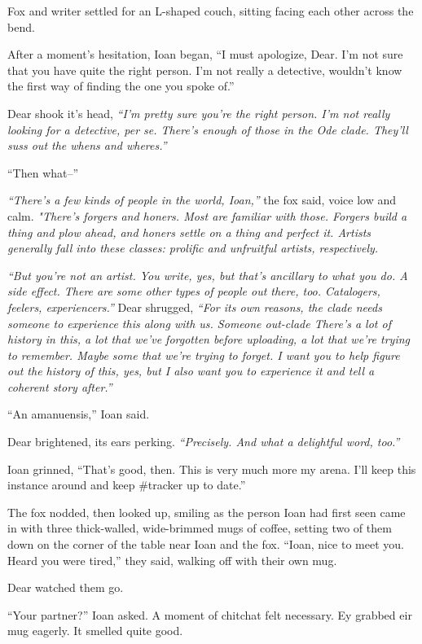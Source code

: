 Fox and writer settled for an L-shaped couch, sitting facing each other across the bend.

After a moment's hesitation, Ioan began, ``I must apologize, Dear. I'm not sure that you have quite the right person. I'm not really a detective, wouldn't know the first way of finding the one you spoke of.''

Dear shook it's head, \emph{``I'm pretty sure you're the right person. I'm not really looking for a detective, per se. There's enough of those in the Ode clade. They'll suss out the whens and wheres.''}

``Then what--''

\emph{``There's a few kinds of people in the world, Ioan,''} the fox said, voice low and calm. \emph{"There's forgers and honers. Most are familiar with those. Forgers build a thing and plow ahead, and honers settle on a thing and perfect it. Artists generally fall into these classes: prolific and unfruitful artists, respectively.}

\emph{``But you're not an artist. You write, yes, but that's ancillary to what you do. A side effect. There are some other types of people out there, too. Catalogers, feelers, experiencers.''} Dear shrugged, \emph{``For its own reasons, the clade needs someone to experience this along with us. Someone out-clade There's a lot of history in this, a lot that we've forgotten before uploading, a lot that we're trying to remember. Maybe some that we're trying to forget. I want you to help figure out the history of this, yes, but I also want you to experience it and tell a coherent story after.''}

``An amanuensis,'' Ioan said.

Dear brightened, its ears perking. \emph{``Precisely. And what a delightful word, too.''}

Ioan grinned, ``That's good, then. This is very much more my arena. I'll keep this instance around and keep \#tracker up to date.''

The fox nodded, then looked up, smiling as the person Ioan had first seen came in with three thick-walled, wide-brimmed mugs of coffee, setting two of them down on the corner of the table near Ioan and the fox. ``Ioan, nice to meet you. Heard you were tired,'' they said, walking off with their own mug.

Dear watched them go.

``Your partner?'' Ioan asked. A moment of chitchat felt necessary. Ey grabbed eir mug eagerly. It smelled quite good.

